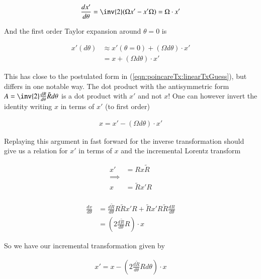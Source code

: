 \begin{align*}
\frac{dx'}{d\theta} = \inv{2}(\Omega x' - x' \Omega) = \Omega \cdot x'
\end{align*}

And the first order Taylor expansion around $\theta =0$ is

\begin{align*}
x'(d\theta) 
&\approx x'(\theta = 0) + ( \Omega d\theta ) \cdot x' \\
&= x + ( \Omega d\theta ) \cdot x'
\end{align*}

This has close to the postulated form in (\ref{eqn:poincareTx:linearTxGuess}), but differs in one notable way.  The dot product with the antisymmetric form $A = \inv{2} \frac{dR}{d\theta} \tilde{R} d\theta$ is a dot product with $x'$ and not $x$!  One can however invert the identity writing $x$ in terms of $x'$ (to first order)

\begin{align*}
x = x' - ( \Omega d\theta ) \cdot x'
\end{align*}

Replaying this argument in fast forward for the inverse transformation should give us a relation for $x'$ in terms of $x$ and the incremental Lorentz transform

\begin{align*}
x' &= R x \tilde{R} \\
\implies \\
x &= \tilde{R} x' {R} \\
\end{align*}

\begin{align*}
\frac{dx}{d\theta}
&= \frac{d \tilde{R}}{d\theta} R \tilde{R} x' R + \tilde{R} x' R \tilde{R} \frac{d {R}}{d\theta}  \\
&= \left(2 \frac{d \tilde{R}}{d\theta} R \right) \cdot x
\end{align*}

So we have our incremental transformation given by

\begin{align}\label{eqn:poincareTx:gotcha}
x'= x - \left(2 \frac{d \tilde{R}}{d\theta} R d\theta \right) \cdot x
\end{align}


